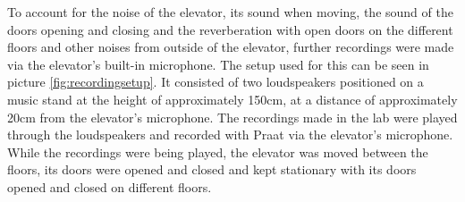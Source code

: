 To account for the noise of the elevator, its sound when moving, the sound of the doors opening and closing and the reverberation with open doors on the different floors and other noises from outside of the elevator, further recordings were made via the elevator's built-in microphone. 
The setup used for this can be seen in picture \ref{fig:recordingsetup}.
It consisted of two loudspeakers positioned on a music stand at the height of approximately 150cm, at a distance of approximately 20cm from the elevator's microphone. 
The recordings made in the lab were played through the loudspeakers and recorded with Praat via the elevator's microphone. 
While the recordings were being played, the elevator was moved between the floors, its doors were opened and closed and kept stationary with its doors opened and closed on different floors.

